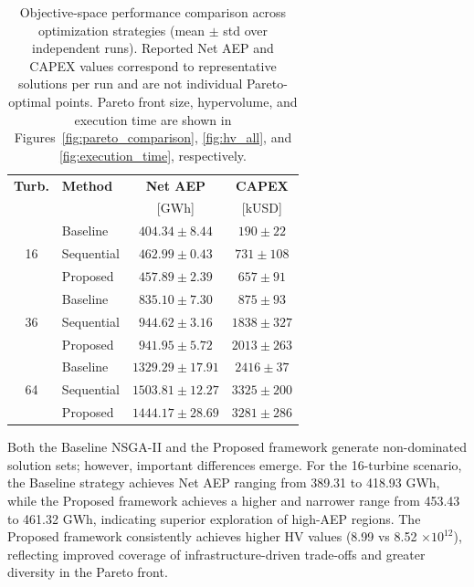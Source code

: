 \documentclass[format=sigconf,anonymous=true,review=true]{acmart}
\begin{document}
\begin{table}[htbp]
\caption{Objective-space performance comparison across optimization strategies (mean $\pm$ std over independent runs). Reported Net AEP and CAPEX values correspond to representative solutions per run and are not individual Pareto-optimal points. Pareto front size, hypervolume, and execution time are shown in Figures~\ref{fig:pareto_comparison}, \ref{fig:hv_all}, and \ref{fig:execution_time}, respectively.}
   
\label{tab:quantitative_summary}
\centering
\begin{tabular}{c l c c}
\toprule
\textbf{Turb.} & \textbf{Method} & \textbf{Net AEP} & \textbf{CAPEX} \\
&  & [GWh] & [kUSD] \\
\midrule
\multirow{3}{*}{16}
& Baseline   & $404.34 \pm 8.44$ & $190 \pm 22$ \\
& Sequential & $462.99 \pm 0.43$ & $731 \pm 108$ \\
& Proposed   & $457.89 \pm 2.39$ & $657 \pm 91$ \\
\midrule
\multirow{3}{*}{36}
& Baseline   & $835.10 \pm 7.30$ & $875 \pm 93$ \\
& Sequential & $944.62 \pm 3.16$ & $1838 \pm 327$ \\
& Proposed   & $941.95 \pm 5.72$ & $2013 \pm 263$ \\
\midrule
\multirow{3}{*}{64}
& Baseline   & $1329.29 \pm 17.91$ & $2416 \pm 37$ \\
& Sequential & $1503.81 \pm 12.27$ & $3325 \pm 200$ \\ 
& Proposed   & $1444.17 \pm 28.69$ & $3281 \pm 286$ \\ 
\bottomrule
\end{tabular}
\end{table}

Both the Baseline NSGA-II and the Proposed framework generate non-dominated solution sets; however, important differences emerge. For the 16-turbine scenario, the Baseline strategy achieves Net AEP ranging from 389.31 to 418.93 GWh, while the Proposed framework achieves a higher and narrower range from 453.43 to 461.32 GWh, indicating superior exploration of high-AEP regions. The Proposed framework consistently achieves higher HV values (8.99 vs 8.52 $\times 10^{12}$), reflecting improved coverage of infrastructure-driven trade-offs and greater diversity in the Pareto front.
\end{document}
